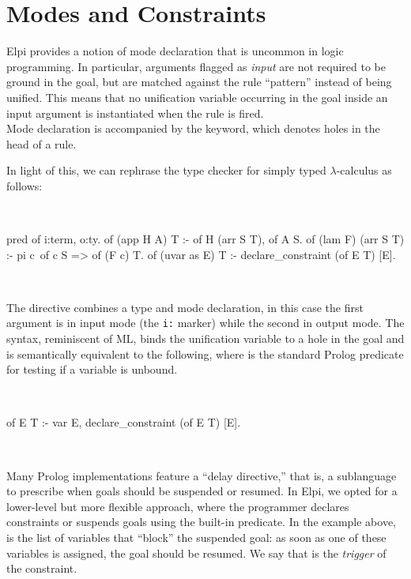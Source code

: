 \documentclass[a4paper, 11pt]{book}
\newenvironment{elpicode}
  {\VerbatimEnvironment~\\\begin{elpibox}\begin{xelpicode}}{\end{xelpicode}
\end{elpibox}\\}
\begin{document}
\section{Modes and Constraints}\label{sec:modes}


Elpi provides a notion of mode declaration that is uncommon in logic
programming. In particular, arguments flagged as \emph{input} are not required to be
ground in the goal, but are matched against the rule ``pattern'' instead of
being unified. This means that no unification variable occurring in the goal
inside an input argument is instantiated when the rule is fired.
~\\

Mode declaration is accompanied by the  keyword, which denotes
holes in the head of a rule.

In light of this, we can rephrase the type checker for simply typed
$\lambda$-calculus as follows:

\begin{elpicode}
pred of i:term, o:ty.
of (app H A) T :- of H (arr S T), of A S.
of (lam F) (arr S T) :- pi c\ of c S => of (F c) T.
of (uvar as E) T :- declare_constraint (of E T) [E].
\end{elpicode}

The  directive combines a type and mode declaration,
in this case the first argument is in input mode (the \texttt{i:} marker)
while the second in output mode.
The  syntax, reminiscent of ML,
binds the unification variable  to a hole in the
goal and is semantically equivalent to the following, where  is
the standard Prolog predicate for testing if a variable is unbound.

\begin{elpicode}
of E T :- var E, declare_constraint (of E T) [E].
\end{elpicode}

Many Prolog implementations feature a ``delay directive,'' that is, a
sublanguage to prescribe when goals should be suspended or resumed. In Elpi,
we opted for a lower-level but more flexible approach, where the programmer
declares constraints or suspends goals using the 
built-in predicate. In the example above, \elpi{[E]} is the list of variables
that ``block'' the suspended goal: as soon as one of these variables is
assigned, the goal should be resumed. We say that  is the \emph{trigger} of
the constraint.
\end{document}
